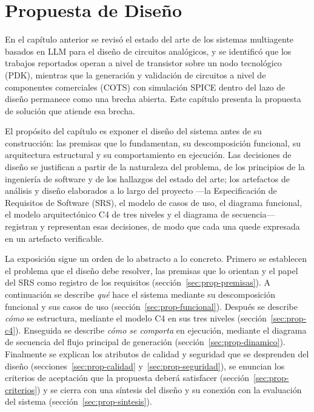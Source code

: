 \section{Propuesta de Diseño}
\label{sec:prop-intro}

En el capítulo anterior se revisó el estado del arte de los sistemas multiagente basados en LLM para el diseño de circuitos analógicos, y se identificó que los trabajos reportados operan a nivel de transistor sobre un nodo tecnológico (PDK), mientras que la generación y validación de circuitos a nivel de componentes comerciales (COTS) con simulación SPICE dentro del lazo de diseño permanece como una brecha abierta. Este capítulo presenta la propuesta de solución que atiende esa brecha.

El propósito del capítulo es exponer el diseño del sistema antes de su construcción: las premisas que lo fundamentan, su descomposición funcional, su arquitectura estructural y su comportamiento en ejecución. Las decisiones de diseño se justifican a partir de la naturaleza del problema, de los principios de la ingeniería de software y de los hallazgos del estado del arte; los artefactos de análisis y diseño elaborados a lo largo del proyecto —la Especificación de Requisitos de Software (SRS), el modelo de casos de uso, el diagrama funcional, el modelo arquitectónico C4 de tres niveles y el diagrama de secuencia— registran y representan esas decisiones, de modo que cada una quede expresada en un artefacto verificable.

La exposición sigue un orden de lo abstracto a lo concreto. Primero se establecen el problema que el diseño debe resolver, las premisas que lo orientan y el papel del SRS como registro de los requisitos (sección~\ref{sec:prop-premisas}). A continuación se describe \textit{qué} hace el sistema mediante su descomposición funcional y sus casos de uso (sección~\ref{sec:prop-funcional}). Después se describe \textit{cómo} se estructura, mediante el modelo C4 en sus tres niveles (sección~\ref{sec:prop-c4}). Enseguida se describe \textit{cómo se comporta} en ejecución, mediante el diagrama de secuencia del flujo principal de generación (sección~\ref{sec:prop-dinamico}). Finalmente se explican los atributos de calidad y seguridad que se desprenden del diseño (secciones~\ref{sec:prop-calidad} y~\ref{sec:prop-seguridad}), se enuncian los criterios de aceptación que la propuesta deberá satisfacer (sección~\ref{sec:prop-criterios}) y se cierra con una síntesis del diseño y su conexión con la evaluación del sistema (sección~\ref{sec:prop-sintesis}).


